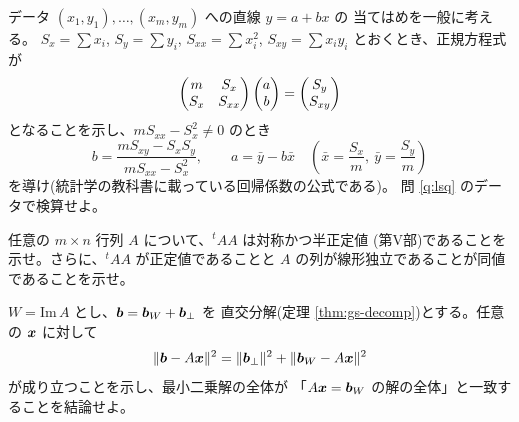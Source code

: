 \begin{mondai}[発展]\label{q:lsq-ex10}
データ $(x_1, y_1), \dots, (x_m, y_m)$ への直線 $y = a + bx$ の
当てはめを一般に考える。
$S_x = \sum x_i$, $S_y = \sum y_i$, $S_{xx} = \sum x_i^2$,
$S_{xy} = \sum x_i y_i$ とおくとき、正規方程式が
\[
\begin{pmatrix}m & S_x \\ S_x & S_{xx}\end{pmatrix}\begin{pmatrix}a \\ b\end{pmatrix} = \begin{pmatrix}S_y \\ S_{xy}\end{pmatrix}
\]
となることを示し、$m S_{xx} - S_x^2 \neq 0$ のとき
\[
b = \frac{m S_{xy} - S_x S_y}{m S_{xx} - S_x^2}, \qquad
a = \bar{y} - b\bar{x}
\quad \left(\bar{x} = \frac{S_x}{m},\ \bar{y} = \frac{S_y}{m}\right)
\]
を導け(統計学の教科書に載っている回帰係数の公式である)。
問 \ref{q:lsq} のデータで検算せよ。
\end{mondai}

\begin{mondai}[証明]\label{q:lsq-ex11}
任意の $m \times n$ 行列 $A$ について、${}^t\!AA$ は対称かつ半正定値
(第V部)であることを示せ。さらに、${}^t\!AA$ が正定値であることと
$A$ の列が線形独立であることが同値であることを示せ。
\end{mondai}

\begin{mondai}[証明]\label{q:lsq-ex12}
$W = \mathrm{Im}\,A$ とし、$\bm{b} = \bm{b}_W + \bm{b}_{\perp}$ を
直交分解(定理 \ref{thm:gs-decomp})とする。任意の $\bm{x}$ に対して
\[
\|\bm{b} - A\bm{x}\|^2 = \|\bm{b}_{\perp}\|^2 + \|\bm{b}_W - A\bm{x}\|^2
\]
が成り立つことを示し、最小二乗解の全体が
「$A\bm{x} = \bm{b}_W$ の解の全体」と一致することを結論せよ。
\end{mondai}

